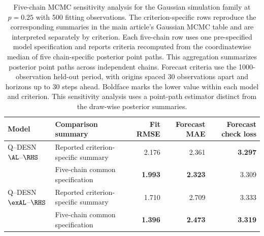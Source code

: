 \begin{table}[!htbp]
\centering
\scriptsize
\setlength{\tabcolsep}{3pt}
\begin{tabular}{@{}llrrr@{}}
\toprule
Model & Comparison summary & Fit RMSE & Forecast MAE & Forecast check loss \\
\midrule
Q--DESN \(\AL\)--\(\RHS\)
  & Reported criterion-specific summary & 2.176 & 2.361 & \textbf{3.297} \\
  & Five-chain common specification & \textbf{1.993} & \textbf{2.323} & 3.309 \\
\addlinespace
Q--DESN \(\exAL\)--\(\RHS\)
  & Reported criterion-specific summary & 1.710 & 2.709 & 3.333 \\
  & Five-chain common specification & \textbf{1.396} & \textbf{2.473} & \textbf{3.319} \\
\bottomrule
\end{tabular}
\caption{Five-chain MCMC sensitivity analysis for the Gaussian simulation
family at \(p=0.25\) with 500 fitting observations. The criterion-specific rows
reproduce the corresponding summaries in the main article's Gaussian MCMC
table and are interpreted separately by criterion. Each five-chain row uses one
pre-specified model specification and reports criteria recomputed from
the coordinatewise median of five chain-specific posterior point paths. This
aggregation summarizes posterior point paths across independent chains.
Forecast criteria use the 1000-observation held-out period, with origins spaced
30 observations apart and horizons up to 30 steps ahead. Boldface
marks the lower value within each model and criterion. This sensitivity analysis
uses a point-path estimator distinct from the draw-wise posterior summaries.}
\label{qdesn:tab:supp-independent-mcmc-five-chain-sensitivity}
\end{table}
